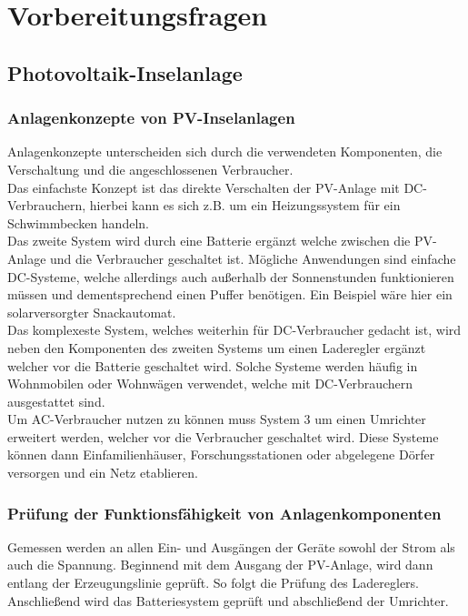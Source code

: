 \newpage
\section{Vorbereitungsfragen}
\subsection{Photovoltaik-Inselanlage}
\subsubsection{Anlagenkonzepte von PV-Inselanlagen }
Anlagenkonzepte unterscheiden sich durch die verwendeten
Komponenten, die Verschaltung und die angeschlossenen Verbraucher.\\
Das einfachste Konzept ist das direkte Verschalten der PV-Anlage mit
DC-Verbrauchern, hierbei kann es sich z.B. um ein Heizungssystem für ein Schwimmbecken handeln.\\
Das zweite System wird durch eine Batterie ergänzt welche zwischen die PV-Anlage und die Verbraucher geschaltet ist.
Mögliche Anwendungen sind einfache DC-Systeme, welche allerdings auch außerhalb der Sonnenstunden
funktionieren müssen und dementsprechend einen Puffer benötigen. Ein Beispiel wäre hier ein solarversorgter Snackautomat.\\
Das komplexeste System, welches weiterhin für DC-Verbraucher gedacht ist, wird neben den Komponenten des zweiten Systems
um einen Laderegler ergänzt welcher vor die Batterie geschaltet wird. Solche Systeme werden häufig in
Wohnmobilen oder Wohnwägen verwendet, welche mit DC-Verbrauchern ausgestattet sind.\\
Um AC-Verbraucher nutzen zu können muss System 3 um einen Umrichter erweitert werden, welcher vor die Verbraucher geschaltet wird. Diese Systeme können dann Einfamilienhäuser, Forschungsstationen oder abgelegene Dörfer versorgen und ein Netz etablieren.\\ 
\subsubsection{Prüfung der Funktionsfähigkeit von Anlagenkomponenten}
Gemessen werden an allen Ein- und Ausgängen der Geräte sowohl der Strom als auch die Spannung.
Beginnend mit dem Ausgang der PV-Anlage, wird dann entlang der Erzeugungslinie geprüft.
So folgt die Prüfung des Ladereglers. Anschließend wird das Batteriesystem geprüft und abschließend der 
Umrichter.\\


